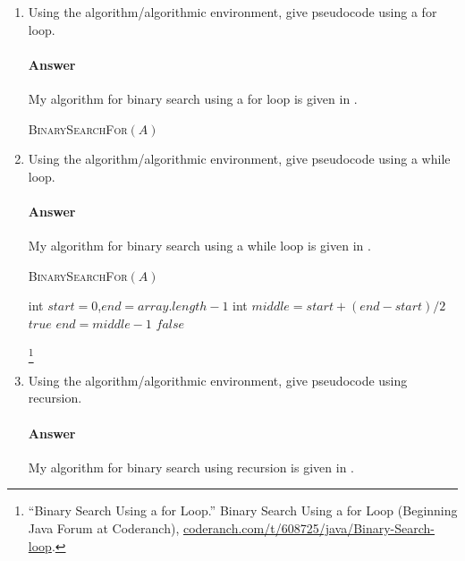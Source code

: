\documentclass{article}
\begin{document}
\begin{enumerate}
    \item Using the algorithm/algorithmic environment,
        give pseudocode using a for loop.

        \paragraph{Answer} My algorithm for binary search using a for loop is given in .

         \begin{algorithm}
            \caption{\textsc{BinarySearchFor}$(A)$}\label{alg:forloop}
            \begin{algorithmic}
				\State {}
			 \end{algorithmic}
        \end{algorithm}
    \item Using the algorithm/algorithmic environment, give pseudocode using a while loop.

        \paragraph{Answer} My algorithm for binary search using a while loop is given in .

        \begin{algorithm}
            \caption{\textsc{BinarySearchFor}$(A)$}\label{alg:whileloop}
            \begin{algorithmic}
                  \State int $start=0$,$end=array.length-1$
					\State int $middle = start + (end - start)/2$
						\State \Return $true$
						\State $end = middle -1$
					\Else 
					\EndIf
				\EndWhile \State
				\Return $false$
            \end{algorithmic}
        \end{algorithm}
		\footnote{“Binary Search Using a for Loop.” Binary Search Using a for Loop (Beginning Java Forum at Coderanch), \url{coderanch.com/t/608725/java/Binary-Search-loop}.}

    \item Using the algorithm/algorithmic environment, give pseudocode using
        recursion.

		\paragraph{Answer} My algorithm for binary search using recursion is given in .


\end{enumerate}
\end{document}
